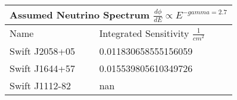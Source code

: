 \documentclass[]{article}
\begin{document}
\begin{tabular}{ |p{3.5cm}||p{4.5cm}|} 
\hline 
\multicolumn{2}{|c|}{Assumed Neutrino Spectrum $ \frac {d \phi}{dE} \propto E ^ {-gamma=2.7} $} \\ 
\hline 
Name&Integrated Sensitivity $\frac{1}{cm^{2}} $ \\ 
\hline 
Swift J2058+05 & \num[round-precision=2, round-mode=figures, scientific-notation=true]{0.011830658555156059}  \\ 
Swift J1644+57 & \num[round-precision=2, round-mode=figures, scientific-notation=true]{0.015539805610349726}  \\ 
Swift J1112-82 & \num[round-precision=2, round-mode=figures, scientific-notation=true]{nan}  \\ 
\hline 
\end{tabular} 
\end{document}
